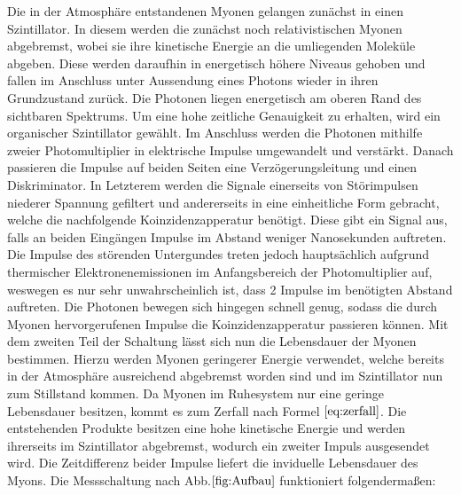  Die in der Atmosphäre entstandenen Myonen gelangen zunächst in einen Szintillator. In diesem werden die zunächst noch relativistischen Myonen abgebremst, wobei sie ihre kinetische Energie an die umliegenden Moleküle abgeben. Diese werden daraufhin in energetisch höhere Niveaus gehoben und fallen im Anschluss unter Aussendung eines Photons wieder in ihren Grundzustand zurück. Die Photonen liegen energetisch am oberen Rand des sichtbaren Spektrums. Um eine hohe zeitliche Genauigkeit zu erhalten, wird ein organischer Szintillator gewählt. Im Anschluss werden die Photonen mithilfe zweier Photomultiplier in elektrische Impulse umgewandelt und verstärkt.
   Danach passieren die Impulse auf beiden Seiten eine Verzögerungsleitung und einen Diskriminator. In Letzterem werden die Signale einerseits von Störimpulsen niederer Spannung gefiltert und andererseits in eine einheitliche Form gebracht, welche die nachfolgende Koinzidenzapperatur benötigt.
     Diese gibt ein Signal aus, falls an beiden Eingängen Impulse im Abstand weniger Nanosekunden auftreten. Die Impulse des störenden Untergundes treten jedoch hauptsächlich aufgrund thermischer Elektronenemissionen im Anfangsbereich der Photomultiplier auf, weswegen es nur sehr unwahrscheinlich ist, dass 2 Impulse im benötigten Abstand auftreten. Die Photonen bewegen sich hingegen schnell genug, sodass die durch Myonen hervorgerufenen Impulse die Koinzidenzapperatur passieren können.
    Mit dem zweiten Teil der Schaltung lässt sich nun die Lebensdauer der Myonen bestimmen. Hierzu werden Myonen geringerer Energie verwendet, welche bereits in der Atmosphäre ausreichend abgebremst worden sind und im Szintillator nun zum Stillstand kommen.
    Da Myonen im Ruhesystem nur eine geringe Lebensdauer besitzen, kommt es zum Zerfall nach Formel $\eqref{eq:zerfall}$. Die entstehenden Produkte besitzen eine hohe kinetische Energie und werden ihrerseits im Szintillator abgebremst, wodurch ein zweiter Impuls ausgesendet wird. Die Zeitdifferenz beider Impulse liefert die inviduelle Lebensdauer des Myons. Die Messschaltung nach Abb.$ \ref{fig:Aufbau}$ funktioniert folgendermaßen:
